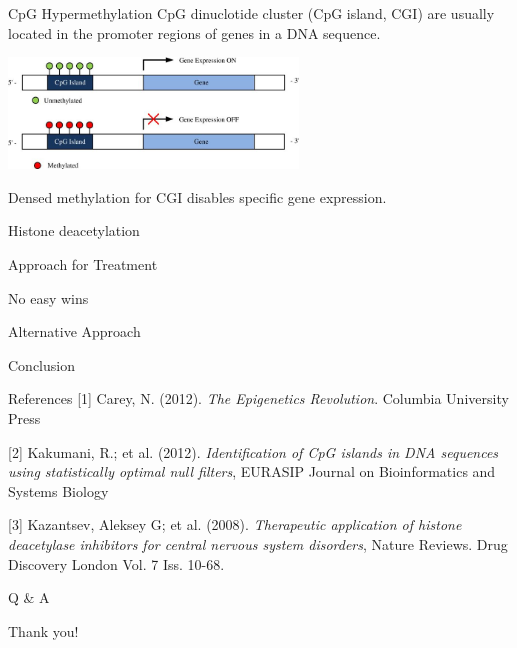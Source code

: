 \documentclass{beamer}
\begin{document}
    \begin{frame}{CpG Hypermethylation}
        CpG dinuclotide cluster (CpG island, CGI) are usually located in the promoter regions of genes in a DNA sequence.
        \begin{center}
            \includegraphics[height=8em]{1}
        \end{center}
        Densed methylation for CGI disables specific gene expression.
    \end{frame}

    \begin{frame}{Histone deacetylation}

    \end{frame}

    \begin{frame}{Approach for Treatment}

    \end{frame}

    \begin{frame}{No easy wins}

    \end{frame}

    \begin{frame}{Alternative Approach}

    \end{frame}

    \begin{frame}{Conclusion}

    \end{frame}

    \begin{frame}{References}
        \footnotesize [1] Carey, N. (2012). \textit{The Epigenetics Revolution}. Columbia University Press
    
        \footnotesize [2] Kakumani, R.; et al. (2012). \textit{Identification of CpG islands in DNA sequences using statistically optimal null filters}, EURASIP Journal on Bioinformatics and Systems Biology 
    
        \footnotesize [3] Kazantsev, Aleksey G; et al. (2008). \textit{Therapeutic application of histone deacetylase inhibitors for central nervous system disorders}, Nature Reviews. Drug Discovery\; London Vol. 7 Iss. 10-68.
    \end{frame}

    \begin{frame}[plain]
        \centering
        \huge Q \& A
    \end{frame}

    \begin{frame}[plain]
        \centering
        \huge Thank you!
    \end{frame}
\end{document}
